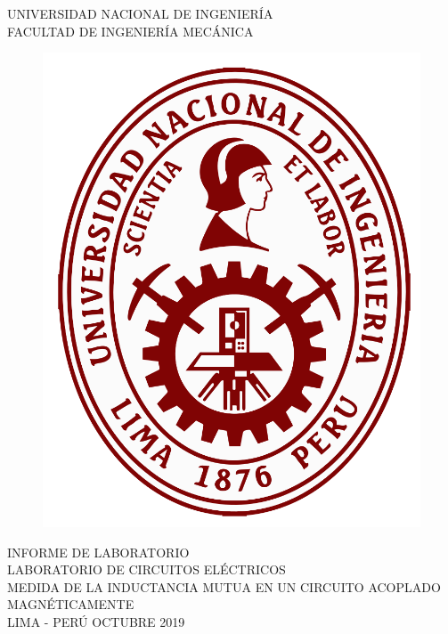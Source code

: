 \documentclass[a4paper,11pt]{report}
\begin{document}
\setcounter{page}{1}
\thispagestyle{empty}
\begin{center}
{\huge UNIVERSIDAD NACIONAL DE INGENIERÍA}\\[0.9cm]
{\Large FACULTAD DE INGENIERÍA MECÁNICA}\\[0.6in]
\end{center}
\begin{figure}[h]
\begin{center}
\includegraphics[scale=0.33]{logoUNI.png}
\vspace{0cm}
\end{center}
\end{figure}
\vspace{0.5cm}
\begin{center}
INFORME DE LABORATORIO\\
LABORATORIO DE CIRCUITOS ELÉCTRICOS\\[5mm]
{\large MEDIDA DE LA INDUCTANCIA MUTUA EN UN CIRCUITO ACOPLADO MAGNÉTICAMENTE}\\[10mm]
\vfill
LIMA - PERÚ \hfill OCTUBRE 2019
\end{center}
\end{document}
